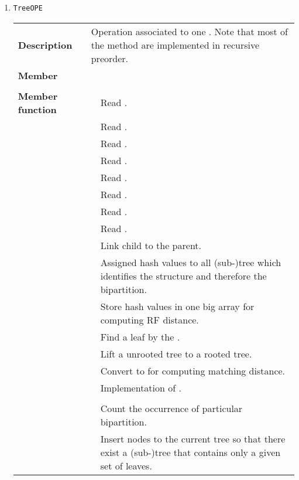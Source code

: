 \documentclass[11pt,a4paper]{article}
\newcommand{\myuline}[1]{%
	\uline{\phantom{#1}}%
	\llap{\contour{white}{#1}}%
}
\newcommand{\mrref}[1]{\texttt{#1}\label{#1}}
\newcommand{\rref}[1]{\hyperref[#1]{\textcolor{blue}{\myuline{\texttt{#1}}}}}
\newcommand{\tref}[2]{\hyperref[#2]{\textcolor{blue}{\myuline{\texttt{#1}}}}}
\newcommand{\memref}[2]{\hyperref[#2#1]{\textcolor{blue}{\myuline{#2::\texttt{#1}}}}}
\theoremstyle{definition}
\theoremstyle{definition}
\numberwithin{equation}{section}
\begin{document}
\begin{enumerate}
		
		\item \mrref{TreeOPE}
		
			\begin{tabular}{>{\bfseries}lp{}p{}}
				Description & \multicolumn{2}{p{0.6\textwidth}}{Operation associated to one \rref{NEWICKTREE}. Note that most of the method are implemented in recursive preorder.} \\
				Member &   & \\
				&   &\\
				Member function& \rref{loadnewicktree} &  Read \rref{NEWICKTREE}.\\
				& \rref{loadnewicktree2} & Read \rref{NEWICKTREE}.\\
				& \rref{floadnewicktree} & Read \rref{NEWICKTREE}.\\
				& \rref{loadnode} & Read \rref{NEWICKTREE}.\\
				& \rref{loadleaf} & Read \rref{NEWICKTREE}.\\
				& \rref{parsetree} & Read \rref{NEWICKTREE}.\\
				& \rref{parsenode} & Read \rref{NEWICKTREE}.\\
				& \rref{parseleaf} & Read \rref{NEWICKTREE}.\\		
				& \rref{addchild} & Link child to the parent.\\
				& \tref{dfs\_compute\_hash}{dfscomputehash}  &  Assigned hash values to all (sub-)tree which identifies the structure and therefore the bipartition.\\
				& \rref{bipart} & Store hash values in one big array for computing RF distance.\\
				& \rref{findleaf} & Find a leaf by the \memref{label}{NEWICKNODE}.\\
				& \rref{normalizedTree} & Lift a unrooted tree to a rooted tree.\\
				& \rref{newick2lcbb} & Convert \rref{NEWICKTREE} to \rref{Ptree} for computing matching distance.\\
				& \rref{newick2ptree} & Implementation of \rref{newick2lcbb}.\\
				& \rref{sumofdegree} & \\
				& \rref{bipartcount} & Count the occurrence of particular bipartition.\\
				& \rref{Addbipart} & Insert nodes to the current tree so that there exist a (sub-)tree that contains only a given set of leaves.
				
			\end{tabular}


\end{enumerate}
\end{document}
